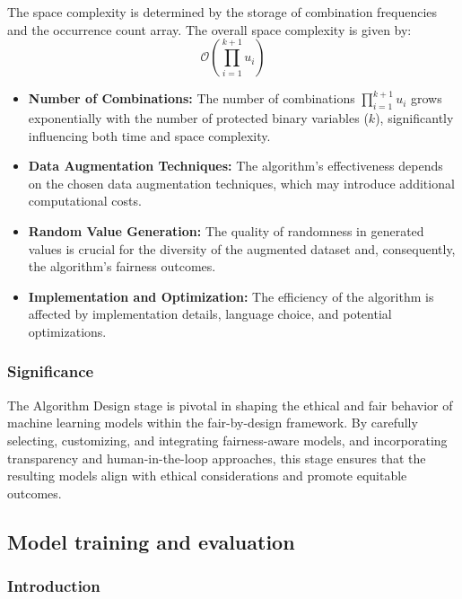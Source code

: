 The space complexity is determined by the storage of combination frequencies and the occurrence count array. The overall space complexity is given by:
\[
\mathcal{O}(\prod_{i=1}^{k+1} u_i)
\]

\begin{itemize}
    \item \textbf{Number of Combinations:} The number of combinations \(\prod_{i=1}^{k+1} u_i\) grows exponentially with the number of protected binary variables (\(k\)), significantly influencing both time and space complexity.
    
    \item \textbf{Data Augmentation Techniques:} The algorithm's effectiveness depends on the chosen data augmentation techniques, which may introduce additional computational costs.
    
    \item \textbf{Random Value Generation:} The quality of randomness in generated values is crucial for the diversity of the augmented dataset and, consequently, the algorithm's fairness outcomes.
    
    \item \textbf{Implementation and Optimization:} The efficiency of the algorithm is affected by implementation details, language choice, and potential optimizations.
\end{itemize}

\subsubsection{Significance}

The Algorithm Design stage is pivotal in shaping the ethical and fair behavior of machine learning models within the fair-by-design framework. By carefully selecting, customizing, and integrating fairness-aware models, and incorporating transparency and human-in-the-loop approaches, this stage ensures that the resulting models align with ethical considerations and promote equitable outcomes.

\subsection{Model training and evaluation}
\label{subsection:model-training}

\subsubsection{Introduction}

